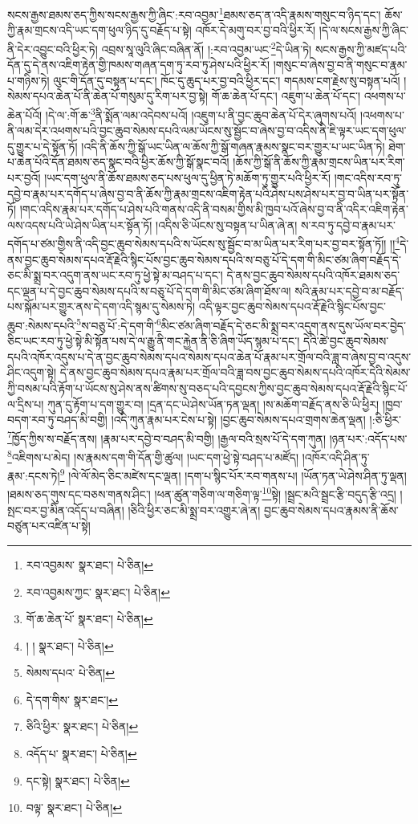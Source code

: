 སངས་རྒྱས་ཐམས་ཅད་ཀྱིས་སངས་རྒྱས་ཀྱི་ཞིང་:རབ་འབྱམ་\footnote{རབ་འབྱམས་  སྣར་ཐང་།  པེ་ཅིན། }ཐམས་ཅད་ན་འདི་རྣམས་གསུང་བ་ཉིད་དང་། ཆོས་ཀྱི་རྣམ་གྲངས་འདི་ཡང་དག་ཕུལ་ཉིད་དུ་བརྗོད་པ་སྟེ། འཁོར་དེ་མགུ་བར་བྱ་བའི་ཕྱིར་རོ། །དེ་ལ་སངས་རྒྱས་ཀྱི་ཞིང་ནི་དེར་འབྱུང་བའི་ཕྱིར་ཏེ། འབྲས་སཱ་ལུའི་ཞིང་བཞིན་ནོ། །:རབ་འབྱམ་ཡང་\footnote{རབ་འབྱམས་ཀྱང་  སྣར་ཐང་།  པེ་ཅིན། }དེ་ཡིན་ཏེ། སངས་རྒྱས་ཀྱི་མཛད་པའི་དོན་དུ་དེ་ནས་འཇིག་རྟེན་གྱི་ཁམས་གཞན་དག་ཏུ་རབ་ཏུ་ཤེས་པའི་ཕྱིར་རོ། །གསུང་བ་ཞེས་བྱ་བ་ནི་གསུང་བ་རྣམ་པ་གཉིས་ཏེ། ལུང་གི་དོན་དུ་བསྟན་པ་དང་། ཁོང་དུ་ཆུད་པར་བྱ་བའི་ཕྱིར་དང་། གདམས་ངག་རྗེས་སུ་བསྟན་པའོ། །སེམས་དཔའ་ཆེན་པོ་ནི་ཆེན་པོ་གསུམ་དུ་རིག་པར་བྱ་སྟེ། གོ་ཆ་ཆེན་པོ་དང་། འཇུག་པ་ཆེན་པོ་དང་། འཕགས་པ་ཆེན་པོའོ། །དེ་ལ་:གོ་ཆ་\footnote{གོ་ཆ་ཆེན་པོ་  སྣར་ཐང་།  པེ་ཅིན། }ནི་སྨོན་ལམ་འདེབས་པའོ། །འཇུག་པ་ནི་བྱང་ཆུབ་ཆེན་པོ་དེར་ཞུགས་པའོ། །འཕགས་པ་ནི་ལམ་དེར་འཕགས་པའི་བྱང་ཆུབ་སེམས་དཔའི་ལམ་ཡོངས་སུ་སྦྱོང་བ་ཞེས་བྱ་བ་འདིས་ནི་ཇི་ལྟར་ཡང་དག་ཕུལ་དུ་གྱུར་པ་དེ་སྟོན་ཏོ། །འདི་ནི་ཆོས་ཀྱི་སྒོ་ཡང་ཡིན་ལ་ཆོས་ཀྱི་སྒོ་གཞན་རྣམས་སྣང་བར་གྱུར་པ་ཡང་ཡིན་ཏེ། ཐེག་པ་ཆེན་པོའི་དོན་ཐམས་ཅད་སྣང་བའི་ཕྱིར་ཆོས་ཀྱི་སྒོ་སྣང་བའོ། །ཆོས་ཀྱི་སྒོ་ནི་ཆོས་ཀྱི་རྣམ་གྲངས་ཡིན་པར་རིག་པར་བྱའོ། །ཡང་དག་ཕུལ་ནི་ཆོས་ཐམས་ཅད་པས་ཕུལ་དུ་ཕྱིན་ཏེ་མཆོག་ཏུ་གྱུར་པའི་ཕྱིར་རོ། །གང་འདིས་རབ་ཏུ་དབྱེ་བ་རྣམ་པར་དགོད་པ་ཞེས་བྱ་བ་ནི་ཆོས་ཀྱི་རྣམ་གྲངས་འཇིག་རྟེན་པའི་ཤེས་པས་ཤེས་པར་བྱ་བ་ཡིན་པར་སྟོན་ཏོ། །གང་འདིས་རྣམ་པར་དགོད་པ་ཤེས་པའི་གནས་འདི་ནི་བསམ་གྱིས་མི་ཁྱབ་པའོ་ཞེས་བྱ་བ་ནི་འདིར་འཇིག་རྟེན་ལས་འདས་པའི་ཡེ་ཤེས་ཡིན་པར་སྟོན་ཏོ། །འདིས་ཅི་ཡོངས་སུ་བསྟན་པ་ཡིན་ཞེ་ན། ས་རབ་ཏུ་དབྱེ་བ་རྣམ་པར་དགོད་པ་ཙམ་གྱིས་ནི་འདི་བྱང་ཆུབ་སེམས་དཔའི་ས་ཡོངས་སུ་སྦྱོང་བ་མ་ཡིན་པར་རིག་པར་བྱ་བར་སྟོན་ཏོ།། །།\footnote{། །  སྣར་ཐང་།  པེ་ཅིན། }དེ་ནས་བྱང་ཆུབ་སེམས་དཔའ་རྡོ་རྗེའི་སྙིང་པོས་བྱང་ཆུབ་སེམས་དཔའི་ས་བཅུ་པོ་དེ་དག་གི་མིང་ཙམ་ཞིག་བརྗོད་དེ་ཅང་མི་སྨྲ་བར་འདུག་ནས་ཡང་རབ་ཏུ་ཕྱེ་སྟེ་མ་བཤད་པ་དང་། དེ་ནས་བྱང་ཆུབ་སེམས་དཔའི་འཁོར་ཐམས་ཅད་དང་ལྡན་པ་དེ་བྱང་ཆུབ་སེམས་དཔའི་ས་བཅུ་པོ་དེ་དག་གི་མིང་ཙམ་ཞིག་ཐོས་ལ། སའི་རྣམ་པར་དབྱེ་བ་མ་བརྗོད་པས་སྐོམ་པར་གྱུར་ནས་དེ་དག་འདི་སྙམ་དུ་སེམས་ཏེ། འདི་ལྟར་བྱང་ཆུབ་སེམས་དཔའ་རྡོ་རྗེའི་སྙིང་པོས་བྱང་ཆུབ་:སེམས་དཔའི་\footnote{སེམས་དཔའ་  པེ་ཅིན། }ས་བཅུ་པོ་:དེ་དག་གི་\footnote{དེ་དག་གིས་  སྣར་ཐང་། }མིང་ཙམ་ཞིག་བརྗོད་དེ་ཅང་མི་སྨྲ་བར་འདུག་ནས་དུས་ཡོལ་བར་བྱེད་ཅིང་ཡང་རབ་ཏུ་ཕྱེ་སྟེ་མི་སྟོན་པས་དེ་ལ་རྒྱུ་ནི་གང་རྐྱེན་ནི་ཅི་ཞིག་ཡོད་སྙམ་པ་དང་། དེའི་ཚེ་བྱང་ཆུབ་སེམས་དཔའི་འཁོར་འདུས་པ་དེ་ན་བྱང་ཆུབ་སེམས་དཔའ་སེམས་དཔའ་ཆེན་པོ་རྣམ་པར་གྲོལ་བའི་ཟླ་བ་ཞེས་བྱ་བ་འདུས་ཤིང་འདུག་སྟེ། དེ་ནས་བྱང་ཆུབ་སེམས་དཔའ་རྣམ་པར་གྲོལ་བའི་ཟླ་བས་བྱང་ཆུབ་སེམས་དཔའི་འཁོར་དེའི་སེམས་ཀྱི་བསམ་པའི་རྟོག་པ་ཡོངས་སུ་ཤེས་ནས་ཚིགས་སུ་བཅད་པའི་དབྱངས་ཀྱིས་བྱང་ཆུབ་སེམས་དཔའ་རྡོ་རྗེའི་སྙིང་པོ་ལ་དྲིས་པ། ཀུན་དུ་རྟོག་པ་དག་གྱུར་བ། །དྲན་དང་ཡེ་ཤེས་ཡོན་ཏན་ལྡན། །ས་མཆོག་བརྗོད་ནས་ཅི་ཡི་ཕྱིར། །ཁྱབ་བདག་རབ་ཏུ་བཤད་མི་བགྱི། །འདི་ཀུན་རྣམ་པར་ངེས་པ་སྟེ། །བྱང་ཆུབ་སེམས་དཔའ་གྲགས་ཆེན་ལྡན། །:ཅི་ཕྱིར་\footnote{ཅིའི་ཕྱིར་  སྣར་ཐང་།  པེ་ཅིན། }ཁྱོད་ཀྱིས་ས་བརྗོད་ནས། །རྣམ་པར་དབྱེ་བ་བཤད་མི་བགྱི། །རྒྱལ་བའི་སྲས་པོ་དེ་དག་ཀུན། །ཉན་པར་:འདོད་པས་\footnote{འདོད་པ་  སྣར་ཐང་།  པེ་ཅིན། }འཇིགས་པ་མེད། །ས་རྣམས་དག་གི་དོན་གྱི་ཚུལ། །ཡང་དག་ཕྱེ་སྟེ་བཤད་པ་མཛོད། །འཁོར་འདི་ཤིན་ཏུ་རྣམ་:དངས་ཏེ།\footnote{དང་སྟེ།  སྣར་ཐང་།  པེ་ཅིན། } །ལེ་ལོ་མེད་ཅིང་མཛེས་དང་ལྡན། །དག་པ་སྙིང་པོར་རབ་གནས་པ། །ཡོན་ཏན་ཡེ་ཤེས་ཤིན་ཏུ་ལྡན། །ཐམས་ཅད་གུས་དང་བཅས་གནས་ཤིང་། །ཕན་ཚུན་གཅིག་ལ་གཅིག་ལྟ་\footnote{བལྟ་  སྣར་ཐང་།  པེ་ཅིན། }སྟེ། །སྦྲང་མའི་སྦྲང་རྩི་བདུད་རྩི་འདྲ། །སྤང་བར་བྱ་མིན་འདོད་པ་བཞིན། །ཅིའི་ཕྱིར་ཅང་མི་སྨྲ་བར་འགྱུར་ཞེ་ན། བྱང་ཆུབ་སེམས་དཔའ་རྣམས་ནི་ཆོས་བཙུན་པར་འཛིན་པ་སྟེ། 